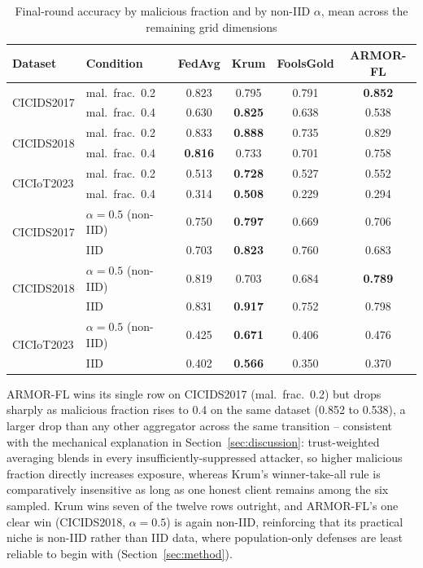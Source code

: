 \documentclass[pdflatex,iicol,sn-mathphys-num]{sn-jnl}%
\theoremstyle{thmstyleone}%
\theoremstyle{thmstyletwo}%
\theoremstyle{thmstylethree}%
\begin{document}
\begin{table}[htbp]
\centering
\caption{Final-round accuracy by malicious fraction and by non-IID $\alpha$, mean across the remaining grid dimensions}\label{tab:perfraction}
\footnotesize
\begin{tabular}{@{}llcccc@{}}
\toprule
Dataset & Condition & FedAvg & Krum & FoolsGold & ARMOR-FL \\
\midrule
\multirow{2}{*}{CICIDS2017} & mal.\ frac.\ 0.2 & 0.823 & 0.795 & 0.791 & \textbf{0.852} \\
 & mal.\ frac.\ 0.4 & 0.630 & \textbf{0.825} & 0.638 & 0.538 \\
\midrule
\multirow{2}{*}{CICIDS2018} & mal.\ frac.\ 0.2 & 0.833 & \textbf{0.888} & 0.735 & 0.829 \\
 & mal.\ frac.\ 0.4 & \textbf{0.816} & 0.733 & 0.701 & 0.758 \\
\midrule
\multirow{2}{*}{CICIoT2023} & mal.\ frac.\ 0.2 & 0.513 & \textbf{0.728} & 0.527 & 0.552 \\
 & mal.\ frac.\ 0.4 & 0.314 & \textbf{0.508} & 0.229 & 0.294 \\
\midrule
\multirow{2}{*}{CICIDS2017} & $\alpha=0.5$ (non-IID) & 0.750 & \textbf{0.797} & 0.669 & 0.706 \\
 & IID & 0.703 & \textbf{0.823} & 0.760 & 0.683 \\
\midrule
\multirow{2}{*}{CICIDS2018} & $\alpha=0.5$ (non-IID) & 0.819 & 0.703 & 0.684 & \textbf{0.789} \\
 & IID & 0.831 & \textbf{0.917} & 0.752 & 0.798 \\
\midrule
\multirow{2}{*}{CICIoT2023} & $\alpha=0.5$ (non-IID) & 0.425 & \textbf{0.671} & 0.406 & 0.476 \\
 & IID & 0.402 & \textbf{0.566} & 0.350 & 0.370 \\
\bottomrule
\end{tabular}
\end{table}

ARMOR-FL wins its single row on CICIDS2017 (mal.\ frac.\ 0.2) but drops sharply as malicious fraction rises to 0.4 on the same dataset (0.852 to 0.538), a larger drop than any other aggregator across the same transition -- consistent with the mechanical explanation in Section~\ref{sec:discussion}: trust-weighted averaging blends in every insufficiently-suppressed attacker, so higher malicious fraction directly increases exposure, whereas Krum's winner-take-all rule is comparatively insensitive as long as one honest client remains among the six sampled. Krum wins seven of the twelve rows outright, and ARMOR-FL's one clear win (CICIDS2018, $\alpha=0.5$) is again non-IID, reinforcing that its practical niche is non-IID rather than IID data, where population-only defenses are least reliable to begin with (Section~\ref{sec:method}).
\end{document}

